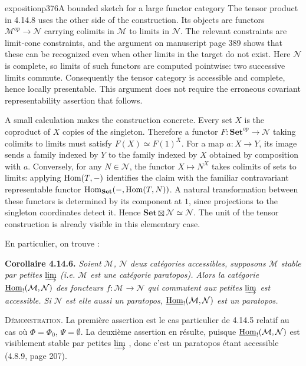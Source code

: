 \begin{dcomment}{exposition}{p376}{A bounded sketch for a large functor category}
The tensor product in 4.14.8 uses the other side of the construction. Its objects are functors $\mathcal M^{op}\to\mathcal N$ carrying colimits in $\mathcal M$ to limits in $\mathcal N$. The relevant constraints are limit-cone constraints, and the argument on manuscript page 389 shows that these can be recognized even when other limits in the target do not exist. Here $\mathcal N$ is complete, so limits of such functors are computed pointwise: two successive limits commute. Consequently the tensor category is accessible and complete, hence locally presentable. This argument does not require the erroneous covariant representability assertion that follows.

A small calculation makes the construction concrete. Every set $X$ is the coproduct of $X$ copies of the singleton. Therefore a functor $F:\mathbf{Set}^{op}\to\mathcal N$ taking colimits to limits must satisfy $F(X)\simeq F(1)^X$. For a map $a:X\to Y$, its image sends a family indexed by $Y$ to the family indexed by $X$ obtained by composition with $a$. Conversely, for any $N\in\mathcal N$, the functor $X\mapsto N^X$ takes colimits of sets to limits: applying $\operatorname{Hom}(T,-)$ identifies the claim with the familiar contravariant representable functor $\operatorname{Hom}_{\mathbf{Set}}(-,\operatorname{Hom}(T,N))$. A natural transformation between these functors is determined by its component at $1$, since projections to the singleton coordinates detect it. Hence $\mathbf{Set}\boxtimes\mathcal N\simeq\mathcal N$. The unit of the tensor construction is already visible in this elementary case.
\end{dcomment}


En particulier, on trouve :

\noindent\textbf{Corollaire 4.14.6.} {\itshape Soient $\mathcal{M}$, $\mathcal{N}$ deux catégories accessibles, supposons $\mathcal{M}$ stable par petites $\varinjlim$ (i.e. $\mathcal{M}$ est une catégorie paratopos). Alors la catégorie $\underline{\mathrm{Hom}}_{!}(\mathcal{M},\mathcal{N})$ des foncteurs $f:\mathcal{M}\longrightarrow\mathcal{N}$ qui commutent aux petites $\varinjlim$ est accessible. Si $\mathcal{N}$ est elle aussi un paratopos, $\underline{\mathrm{Hom}}_{!}(\mathcal{M},\mathcal{N})$ est un paratopos.}

\noindent\textsc{Démonstration}. La première assertion est le cas particulier de 4.14.5 relatif au cas où $\Phi=\Phi_0$, $\Psi=\emptyset$. La deuxième assertion en résulte, puisque $\underline{\mathrm{Hom}}_{!}(\mathcal{M},\mathcal{N})$ est visiblement stable par petites $\varinjlim$ , donc c'est un paratopos étant accessible (4.8.9, page 207).

